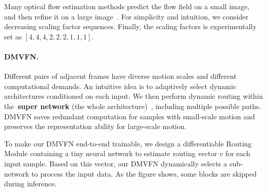 \documentclass[10pt,twocolumn,letterpaper]{article}
\newcommand{\backwardwarp}{\overleftarrow{\mathcal{W}}}
\begin{document}
Many optical flow estimation methods predict the flow field on a small image, and then refine it on a large image~\cite{pwcnet,gmflow}. For simplicity and intuition, we consider decreasing scaling factor sequences. Finally, the scaling factors is experimentally set as $[4,4,4,2,2,2,1,1,1]$.

\iffalse 
Formally, 
\begin{equation}
     \textbf{x}^i = Concat(I_{t-1}^{i-1}, I_t^{i-1}, \tilde{I}^{i-1}_{t+1}, \textbf{F}^{i-1}_{t+1}),
\end{equation}
\begin{equation}
     \textbf{m}^i = Convs_1(Resize(\textbf{x}^i, 1/S^i)),
\end{equation}
\begin{equation}
     \textbf{f}^i = Concat(Resize(\textbf{m}^i, 2S^i), Convs_2(\textbf{x}^i),
\end{equation}
\begin{equation}
     \textbf{F}^i_{t+1} = TransposedConv(\textbf{f}^i)+\textbf{F}^{i-1}_{t+1},
\end{equation}
\begin{equation}
     \tilde{I}^{i}_{t+1} = \backwardwarp(I_{t-1}, I_{t}, \textbf{F}_{t+1}^i),
\end{equation}
where we denote the two-way convolution operations as $Convs_1$ and $Convs_2$. 
\fi




\paragraph{DMVFN.} Different pairs of adjacent frames have diverse motion scales and different computational demands. An intuitive idea is to adaptively select dynamic architectures conditioned on each input. We then perform dynamic routing within the~\textbf{super network} (the whole architecture)~\cite{dynamicnn}, including multiple possible paths. DMVFN saves redundant computation for samples with small-scale motion and preserves the representation ability for large-scale motion.

To make our DMVFN end-to-end trainable, we design a differentiable Routing Module containing a tiny neural network to estimate routing vector $v$ for each input sample. Based on this vector, our DMVFN dynamically selects a sub-network to process the input data. As the figure shows, some blocks are skipped during inference.
\end{document}
